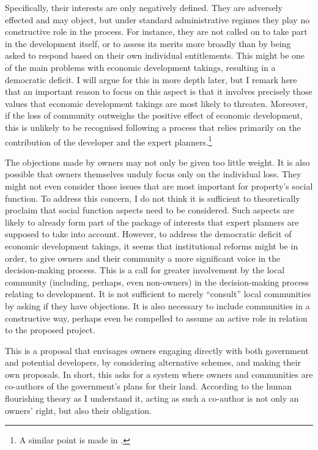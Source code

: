 Specifically, their interests are only negatively defined. They are adversely effected and may object, but under standard administrative regimes they play no constructive role in the process. For instance, they are not called on to take part in the development itself, or to assess its merits more broadly than by being asked to respond based on their own individual entitlements. This might be one of the main problems with economic development takings, resulting in a democratic deficit. I will argue for this in more depth later, but I remark here that an important reason to focus on this aspect is that it involves precisely those values that economic development takings are most likely to threaten. Moreover, if the loss of community outweighs the positive effect of economic development, this is unlikely to be recognised following a process that relies primarily on the contribution of the developer and the expert planners.\footnote{A similar point is made in \cite{underkuffler06}.} 

The objections made by owners may not only be given too little weight. It is also possible that owners themselves unduly focus only on the individual loss. They might not even consider those issues that are most important for property's social function. To address this concern, I do not think it is sufficient to theoretically proclaim that social function aspects need to be considered. Such aspects are likely to already form part of the package of interests that expert planners are supposed to take into account. However, to address the democratic deficit of economic development takings, it seems that institutional reforms might be in order, to give owners and their community a more significant voice in the decision-making process. This is a call for greater involvement by the local community (including, perhaps, even non-owners) in the decision-making process relating to development. It is not sufficient to merely ``consult'' local communities by asking if they have objections. It is also necessary to include communities in a constructive way, perhaps even be compelled to assume an active role in relation to the proposed project.

This is a proposal that envisages owners engaging directly with both government and potential developers, by considering alternative schemes, and making their own proposals. In short, this asks for a system where owners and communities are co-authors of the government's plans for their land.  According to the human flourishing theory as I understand it, acting as such a co-author is not only an owners' right, but also their obligation. 

